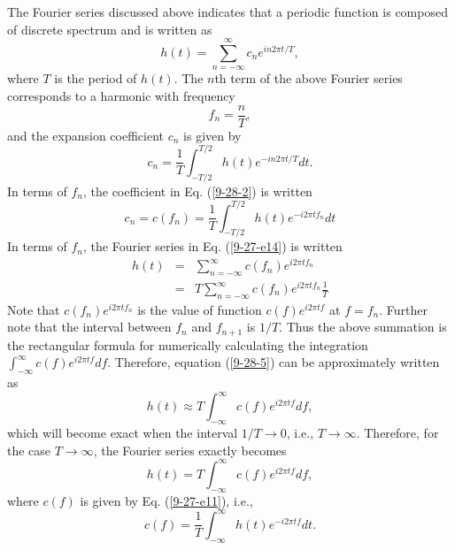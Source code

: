 \documentclass{article}
\begin{document}
The Fourier series discussed above indicates that a periodic function is
composed of discrete spectrum and is written as
\begin{equation}
  \label{9-27-e14} h (t) = \sum_{n = - \infty}^{\infty} c_n e^{i n 2 \pi t /
  T},
\end{equation}
where $T$ is the period of $h (t)$. The $n$th term of the above Fourier series
corresponds to a harmonic with frequency
\begin{equation}
  \label{9-27-e10} f_n = \frac{n}{T},
\end{equation}
and the expansion coefficient $c_n$ is given by
\begin{equation}
  \label{9-28-2} c_n = \frac{1}{T} \int_{- T / 2}^{T / 2} h (t) e^{- i n 2 \pi
  t / T} d t.
\end{equation}
In terms of $f_n$, the coefficient in Eq. (\ref{9-28-2}) is written
\begin{equation}
  \label{9-27-e11} c_n = c (f_n) = \frac{1}{T} \int_{- T / 2}^{T / 2} h (t)
  e^{- i 2 \pi t f_n} d t
\end{equation}
In terms of $f_n$, the Fourier series in Eq. (\ref{9-27-e14}) is written
\begin{eqnarray}
  h (t) & = & \sum_{n = - \infty}^{\infty} c (f_n) e^{i 2 \pi t f_n}
  \nonumber\\
  & = & T \sum_{n = - \infty}^{\infty} c (f_n) e^{i 2 \pi t f_n} \frac{1}{T} 
  \label{9-28-5}
\end{eqnarray}
Note that $c (f_n) e^{i 2 \pi t f_n}$ is the value of function $c (f) e^{i 2
\pi t f}$ at $f = f_n$. Further note that the interval between $f_n$ and $f_{n
+ 1}$ is $1 / T$. Thus the above summation is the rectangular formula for
numerically calculating the integration $\int_{- \infty}^{\infty} c (f) e^{i 2
\pi t f} d f$. Therefore, equation (\ref{9-28-5}) can be approximately written
as
\begin{equation}
  h (t) \approx T \int_{- \infty}^{\infty} c (f) e^{i 2 \pi t f} d f,
\end{equation}
which will become exact when the interval $1 / T \rightarrow 0$, i.e., $T
\rightarrow \infty$. Therefore, for the case $T \rightarrow \infty$, the
Fourier series exactly becomes
\begin{equation}
  \label{9-28-6} h (t) = T \int_{- \infty}^{\infty} c (f) e^{i 2 \pi t f} d f,
\end{equation}
where $c (f)$ is given by Eq. (\ref{9-27-e11}), i.e.,
\begin{equation}
  \label{9-28-7} c (f) = \frac{1}{T} \int_{- \infty}^{\infty} h (t) e^{- i 2
  \pi t f} d t.
\end{equation}
\end{document}
